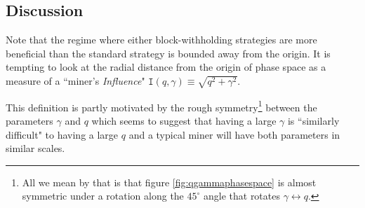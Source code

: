 \documentclass[letterpaper,12pt]{report}
\theoremstyle{plain}
\theoremstyle{definition}
\begin{document}
\noindent%
\begin{minipage}{\linewidth}
\label{fig:qgammaphasespace}
\end{minipage}
\linebreak

\subsection{Discussion}

Note that the regime where either block-withholding strategies are more beneficial than the standard strategy is bounded away from the origin. It is tempting to look at the radial distance from the origin of phase space as a measure of a ``miner's \textit{Influence}" $\mathtt{I}(q,\gamma)\equiv \sqrt{q^2+\gamma^2}$.

This definition is partly motivated by the rough symmetry\footnote{All we mean by that is that figure \ref{fig:qgammaphasespace} is almost symmetric under a rotation along the $45^{\circ}$ angle that rotates $\gamma \leftrightarrow q$.} between the parameters $\gamma$ and $q$ which seems to suggest that having a large $\gamma$ is ``similarly difficult" to having a large $q$ and a typical miner will have both parameters in similar scales. 
\end{document}
